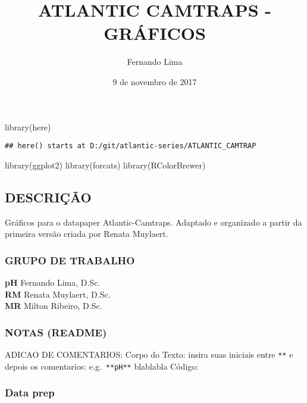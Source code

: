 \documentclass[
]{article}
\title{ATLANTIC CAMTRAPS - GRÁFICOS}
\author{Fernando Lima}
\date{9 de novembro de 2017}
\newenvironment{Shaded}{\begin{snugshade}}{\end{snugshade}}
\newcommand{\FunctionTok}[1]{\textcolor[rgb]{0.00,0.00,0.00}{#1}}
\newcommand{\NormalTok}[1]{#1}
\begin{document}
\maketitle

\begin{Shaded}
\begin{Highlighting}[]
\FunctionTok{library}\NormalTok{(here)}
\end{Highlighting}
\end{Shaded}

\begin{verbatim}
## here() starts at D:/git/atlantic-series/ATLANTIC_CAMTRAP
\end{verbatim}

\begin{Shaded}
\begin{Highlighting}[]
\FunctionTok{library}\NormalTok{(ggplot2)}
\FunctionTok{library}\NormalTok{(forcats)}
\FunctionTok{library}\NormalTok{(RColorBrewer)}
\end{Highlighting}
\end{Shaded}

\hypertarget{descriuxe7uxe3o}{%
\subsection{DESCRIÇÃO}\label{descriuxe7uxe3o}}

Gráficos para o datapaper Atlantic-Camtraps. Adaptado e organizado a
partir da primeira versão criada por Renata Muylaert.

\hypertarget{grupo-de-trabalho}{%
\subsubsection{GRUPO DE TRABALHO}\label{grupo-de-trabalho}}

\textbf{pH} Fernando Lima, D.Sc.\\
\textbf{RM} Renata Muylaert, D.Sc.\\
\textbf{MR} Milton Ribeiro, D.Sc.

\hypertarget{notas-readme}{%
\subsubsection{NOTAS (README)}\label{notas-readme}}

ADICAO DE COMENTARIOS: Corpo do Texto: insira suas iniciais entre
\texttt{**} e depois os comentarios: e.g.~\texttt{**pH**} blablabla
Código:

\hypertarget{data-prep}{%
\subsubsection{Data prep}\label{data-prep}}
\end{document}
